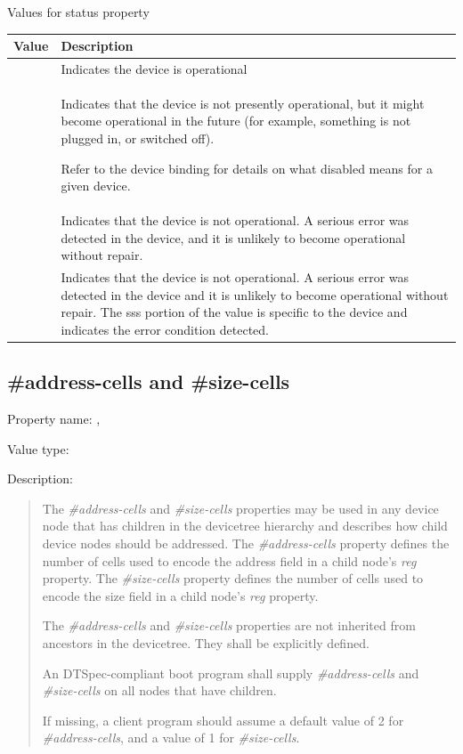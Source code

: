 \documentclass[a4paper,10pt,oneside]{sphinxmanual}
\begin{document}
\begin{threeparttable}
\capstart\caption{Values for status property}\label{devicetree-basics:table-prop-status-values}\label{devicetree-basics:id8}
\begin{tabulary}{\linewidth}{| l J |}
\hline
\textsf{\relax 
Value
} & \textsf{\relax 
Description
}\\
\hline
{}
 & 
Indicates the device is operational
\\
\hline
{}
 & 
Indicates that the device is not presently operational, but it
might become operational in the future (for example, something
is not plugged in, or switched off).

Refer to the device binding for details on what disabled means
for a given device.
\\
\hline
{}
 & 
Indicates that the device is not operational. A serious error
was detected in the device, and it is unlikely to become
operational without repair.
\\
\hline
{}
 & 
Indicates that the device is not operational. A serious error
was detected in the device and it is unlikely to become
operational without repair. The sss portion of the value is
specific to the device and indicates the error condition
detected.
\\
\hline\end{tabulary}

\end{threeparttable}



\subsection{\#address-cells and \#size-cells}
\label{devicetree-basics:address-cells-and-size-cells}
Property name: , 

Value type: 

Description:
\begin{quote}

The \emph{\#address-cells} and \emph{\#size-cells} properties may be used in any
device node that has children in the devicetree hierarchy and describes
how child device nodes should be addressed. The \emph{\#address-cells}
property defines the number of  cells used to encode the address
field in a child node's \emph{reg} property. The \emph{\#size-cells} property
defines the number of  cells used to encode the size field in a
child node’s \emph{reg} property.

The \emph{\#address-cells} and \emph{\#size-cells} properties are not inherited from
ancestors in the devicetree. They shall be explicitly defined.

An DTSpec-compliant boot program shall supply \emph{\#address-cells} and
\emph{\#size-cells} on all nodes that have children.

If missing, a client program should assume a default value of 2 for
\emph{\#address-cells}, and a value of 1 for \emph{\#size-cells}.
\end{quote}
\end{document}
